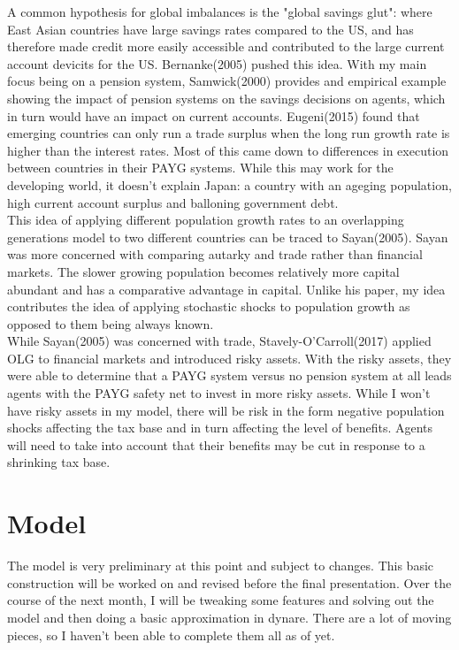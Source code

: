\documentclass[dvips,12pt]{article}
\begin{document}
A common hypothesis for global imbalances is the "global savings glut": where East Asian countries have large savings rates compared to the US, and has therefore made credit more easily accessible and contributed to the large current account devicits for the US. Bernanke(2005) pushed this idea. With my main focus being on a pension system, Samwick(2000) provides and empirical example showing the impact of pension systems on the savings decisions on agents, which in turn would have an impact on current accounts. Eugeni(2015) found that emerging countries can only run a trade surplus when the long run growth rate is higher than the interest rates. Most of this came down to differences in execution between countries in their PAYG systems. While this may work for the developing world, it doesn't explain Japan: a country with an ageging population, high current account surplus and balloning government debt.\\  

This idea of applying different population growth rates to an overlapping generations model to two different countries can be traced to Sayan(2005). Sayan was more concerned with comparing autarky and trade rather than financial markets. The slower growing population becomes relatively more capital abundant and has a comparative advantage in capital. Unlike his paper, my idea contributes the idea of applying stochastic shocks to population growth as opposed to them being always known.\\

While Sayan(2005) was concerned with trade, Stavely-O'Carroll(2017) applied OLG to financial markets and introduced risky assets. With the risky assets, they were able to determine that a PAYG system versus no pension system at all leads agents with the PAYG safety net to invest in more risky assets. While I won't have risky assets in my model, there will be risk in the form negative population shocks affecting the tax base and in turn affecting the level of benefits. Agents will need to take into account that their benefits may be cut in response to a shrinking tax base.\\



\section{Model}

The model is very preliminary at this point and subject to changes. This basic construction will be worked on and revised before the final presentation. Over the course of the next month, I will be tweaking some features and solving out the model and then doing a basic approximation in dynare. There are a lot of moving pieces, so I haven't been able to complete them all as of yet. \\
\end{document}
